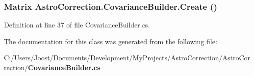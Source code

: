 \subsubsection[{Create}]{\setlength{\rightskip}{0pt plus 5cm}Matrix AstroCorrection.CovarianceBuilder.Create ()}\label{class_astro_correction_1_1_covariance_builder_aceeea96620c3efb0be54ac5cfd50b5c9}


Definition at line 37 of file CovarianceBuilder.cs.

The documentation for this class was generated from the following file:\begin{DoxyCompactItemize}
\item 
C:/Users/Joost/Documents/Development/MyProjects/AstroCorrection/AstroCorrection/{\bf CovarianceBuilder.cs}\end{DoxyCompactItemize}
